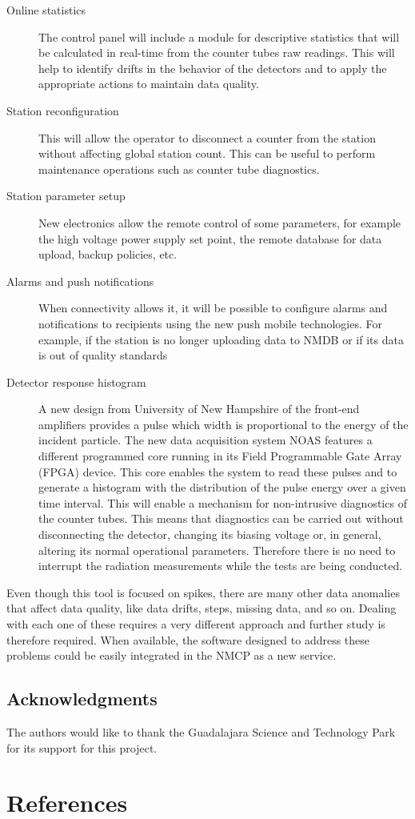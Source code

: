 \documentclass[a4paper]{jpconf}
\begin{document}
\begin{description}
    \item[Online statistics] The control panel will include a module for
        descriptive statistics that will be calculated in real-time from the
        counter tubes raw readings. This will help to identify drifts in the
        behavior of the detectors and to apply the appropriate actions to
        maintain data quality.
    \item[Station reconfiguration] This will allow the operator to disconnect a
        counter from the station without affecting global station count. This
        can be useful to perform maintenance operations such as counter tube
        diagnostics. 
    \item[Station parameter setup] New electronics allow the remote control of
        some parameters, for example the high voltage power supply set point,
        the remote database for data upload, backup policies, etc.
    \item[Alarms and push notifications] When connectivity allows it, it will
        be possible to configure alarms and notifications to recipients using
        the new push mobile technologies. For example, if the station is no
        longer uploading data to NMDB or if its data is out of quality
        standards
    \item[Detector response histogram] A new design from University of New
        Hampshire of the front-end amplifiers provides a pulse which width is
        proportional to the energy of the incident particle. The new data
        acquisition system NOAS features a different programmed core running in
        its Field Programmable Gate Array (FPGA) device. This core enables the
        system to read these pulses and to generate a histogram with the
        distribution of the pulse energy over a given time interval. This will
        enable a mechanism for non-intrusive diagnostics of the counter tubes.
        This means that diagnostics can be carried out without disconnecting the
        detector, changing its biasing voltage or, in general, altering its
        normal operational parameters. Therefore there is no need to interrupt
        the radiation measurements while the tests are being conducted.
\end{description}

Even though this tool is focused on spikes, there are many other data anomalies
that affect data quality, like data drifts, steps, missing data, and so on.
Dealing with each one of these requires a very different approach and further
study is therefore required. When available, the software designed to address
these problems could be easily integrated in the NMCP as a new service.

\subsection*{Acknowledgments} 

The authors would like to thank the Guadalajara Science and Technology Park for
its support for this project.


\section*{References}
 
\end{document}
